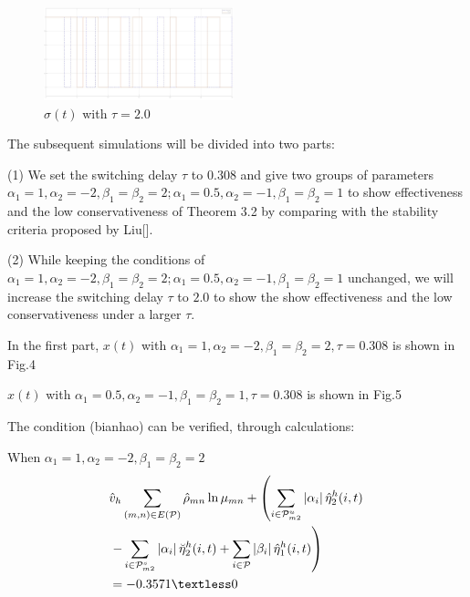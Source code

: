 \documentclass[twocolumn]{autart}    %
\begin{document}
\begin{exmp}
\begin{figure}[htbp]
    \centering
    \includegraphics[width=0.49\textwidth,height=0.245\textwidth]{alpha_half_tau2.jpg}
    \caption{$\sigma(t)$ with $\tau=2.0$}
    \end{figure} 

The subsequent simulations will be divided into two parts:

(1) We set the switching delay $\tau$ to $0.308$ and give two groups of parameters $\alpha_{1} = 1,\alpha_{2} = -2,\beta_{1} = \beta_{2} =2;\alpha_{1} = 0.5,\alpha_{2} = -1,\beta_{1} = \beta_{2} =1$ to show effectiveness and the low conservativeness of Theorem 3.2 by comparing with the stability criteria proposed by Liu[].

(2) While keeping the conditions of $\alpha_{1} = 1,\alpha_{2} = -2,\beta_{1} = \beta_{2} =2;\alpha_{1} = 0.5,\alpha_{2} = -1,\beta_{1} = \beta_{2} =1$ unchanged, we will increase the switching delay $\tau$ to $2.0$ to show the show effectiveness and the low conservativeness under a larger $\tau$.

In the first part, $x(t)$ with $\alpha_{1} = 1,\alpha_{2} = -2,\beta_{1} = \beta_{2} =2,\tau=0.308$ is shown in Fig.4

$x(t)$ with $\alpha_{1} = 0.5,\alpha_{2} = -1,\beta_{1} = \beta_{2} =1,\tau=0.308$ is shown in Fig.5

The condition (bianhao) can be verified, through calculations: 


When $\alpha_{1} = 1,\alpha_{2} = -2,\beta_{1} = \beta_{2} =2$
\begin{equation}
    \begin{aligned}
        &\hat{v}_{h}\sum_{(m,n) \in E(\mathcal{P})}\hat{\rho}_{mn}\ln\mu_{mn}+ \left(\sum_{i \in \mathcal{P}_{m2}^{u}}\left|\alpha_{i}\right|\hat{\eta}^{h}_{2}(i,t)\right.\\
        &\left.-\sum_{i \in \mathcal{P}_{m2}^{s}}\left|\alpha_{i}\right|\breve{\eta}^{h}_{2}(i,t)+\sum_{i \in \mathcal{P}}\left|\beta_{i}\right|\hat{\eta}^{h}_{1}(i,t) \right)\\
        &=-0.3571 \textless 0
    \end{aligned}
\end{equation}


\end{exmp}
\end{document}
